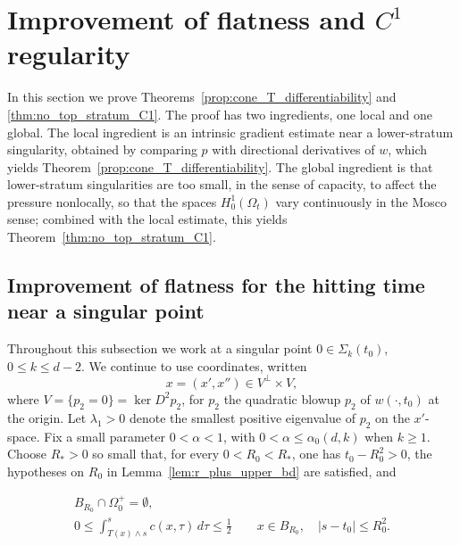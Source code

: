\documentclass[11pt]{amsart}
\numberwithin{equation}{section}
\numberwithin{figure}{section}
\theoremstyle{plain}
\theoremstyle{definition}
\theoremstyle{remark}
\theoremstyle{plain}
\begin{document}
\section{\texorpdfstring{Improvement of flatness and $C^1$ regularity}{Improvement of flatness and C1 regularity}}\label{sec:improvement-flatness}
In this section we prove Theorems~\ref{prop:cone_T_differentiability} and
\ref{thm:no_top_stratum_C1}. The proof has two ingredients, one local and one global. The
local ingredient is an intrinsic gradient estimate near a lower-stratum singularity,
obtained by comparing $p$ with directional derivatives of $w$, which yields
Theorem~\ref{prop:cone_T_differentiability}. The global ingredient is that lower-stratum
singularities are too small, in the sense of capacity, to affect the pressure nonlocally,
so that the spaces $H^1_0(\Omega_t)$ vary continuously in the Mosco sense; combined with
the local estimate, this yields Theorem~\ref{thm:no_top_stratum_C1}.

\subsection{Improvement of flatness for the hitting time near a singular point}

Throughout this subsection we work at a singular point \(0\in\Sigma_k(t_0)\),
\(0\le k\le d-2\). We continue to use coordinates, written
\[
    x=(x',x'')\in V^\perp\times V,
\]
where $V = \{ p_2 = 0\} = \ker D^2 p_2$, for $p_2$ the quadratic blowup \(p_2\) of
\(w(\cdot,t_0)\) at the origin. Let \(\lambda_1>0\) denote
the smallest positive eigenvalue of \(p_2\) on the \(x'\)-space. Fix a small parameter
\(0<\alpha<1\), with \(0<\alpha\leq\alpha_0(d,k)\) when \(k\geq1\).
Choose \(R_*>0\) so small that, for every \(0<R_0<R_*\),
one has \(t_0-R_0^2>0\), the hypotheses on \(R_0\) in
Lemma~\ref{lem:r_plus_upper_bd} are satisfied, and

\begin{equation}\label{eq:cone_local_mass_bound}
\begin{gathered}
    B_{R_0}\cap\Omega_0^{+}=\emptyset,\\
    0\leq \int_{T(x)\wedge s}^s c(x,\tau)\,d\tau\leq\frac12
    \qquad x\in B_{R_0},\quad |s-t_0|\leq R_0^2 .
\end{gathered}
\end{equation}
\end{document}

